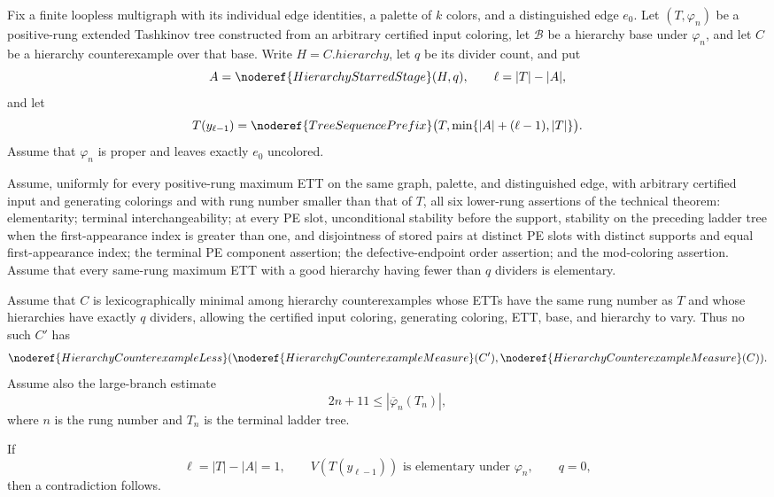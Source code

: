 \begin{lemma}
Fix a finite loopless multigraph with its individual edge identities, a
palette of $k$ colors, and a distinguished edge $e_0$.  Let
$(T,\varphi_n)$ be a positive-rung extended Tashkinov tree constructed
from an arbitrary certified input coloring, let $\mathcal B$ be a
hierarchy base under $\varphi_n$, and let $C$ be a hierarchy
counterexample over that base.  Write $H=C.\mathit{hierarchy}$, let $q$
be its divider count, and put
\[
 A=\noderef{HierarchyStarredStage}(H,q),\qquad
 \ell=|T|-|A|,
\]
and let
\[
 T(y_{\ell-1})=
 \noderef{TreeSequencePrefix}
   \bigl(T,\min\{|A|+(\ell-1),|T|\}\bigr).
\]
Assume that $\varphi_n$ is proper and leaves exactly $e_0$ uncolored.

Assume, uniformly for every positive-rung maximum ETT on the same graph,
palette, and distinguished edge, with arbitrary certified input and
generating colorings and with rung number smaller than that of $T$, all
six lower-rung assertions of the technical theorem: elementarity;
terminal interchangeability; at every PE slot, unconditional stability
before the support, stability on the preceding ladder tree when the
first-appearance index is greater than one, and disjointness of stored
pairs at distinct PE slots with distinct supports and equal
first-appearance index; the terminal PE component assertion; the
defective-endpoint order assertion; and the mod-coloring assertion.
Assume that every same-rung maximum ETT with a good hierarchy having
fewer than $q$ dividers is elementary.

Assume that $C$ is lexicographically minimal among hierarchy
counterexamples whose ETTs have the same rung number as $T$ and whose
hierarchies have exactly $q$ dividers, allowing the certified input
coloring, generating coloring, ETT, base, and hierarchy to vary.  Thus
no such $C'$ has
\[
 \noderef{HierarchyCounterexampleLess}
   (\noderef{HierarchyCounterexampleMeasure}(C'),
    \noderef{HierarchyCounterexampleMeasure}(C)).
\]
Assume also the large-branch estimate
\[
 2n+11\leq |\overline\varphi_n(T_n)|,
\]
where $n$ is the rung number and $T_n$ is the terminal ladder tree.

If
\[
 \ell=|T|-|A|=1,\qquad
 V(T(y_{\ell-1}))\text{ is elementary under }\varphi_n,
 \qquad q=0,
\]
then a contradiction follows.
\end{lemma}
